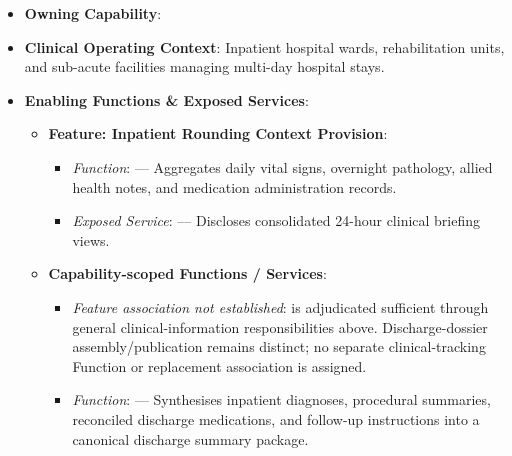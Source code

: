 \begin{itemize}

\item 
\textbf{Owning Capability}: \texttt{}



\item 
\textbf{Clinical Operating Context}: Inpatient hospital wards, rehabilitation units, and sub-acute facilities managing multi-day hospital stays.



\item 
\textbf{Enabling Functions \& Exposed Services}:


\begin{itemize}

\item 
\textbf{Feature: Inpatient Rounding Context Provision}:


\begin{itemize}

\item 
\emph{Function}: \texttt{} — Aggregates daily vital signs, overnight pathology, allied health notes, and medication administration records.



\item 
\emph{Exposed Service}: \texttt{} — Discloses consolidated 24-hour clinical briefing views.



\end{itemize}


\item 
\textbf{Capability-scoped Functions /\allowbreak{} Services}:


\begin{itemize}

\item 
\emph{Feature association not established}: \texttt{} is adjudicated sufficient through general clinical-information responsibilities above. Discharge-dossier assembly/\allowbreak{}publication remains distinct; no separate clinical-tracking Function or replacement association is assigned.



\item 
\emph{Function}: \texttt{} — Synthesises inpatient diagnoses, procedural summaries, reconciled discharge medications, and follow-up instructions into a canonical discharge summary package.




\end{itemize}
\end{itemize}
\end{itemize}
